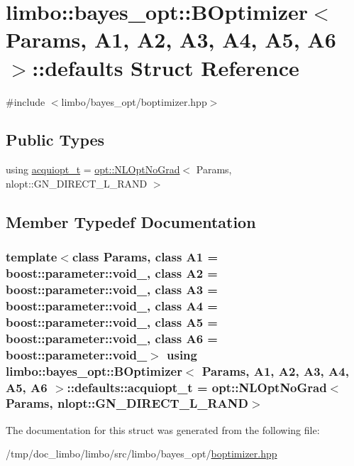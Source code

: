 \hypertarget{structlimbo_1_1bayes__opt_1_1_b_optimizer_1_1defaults}{}\section{limbo\+:\+:bayes\+\_\+opt\+:\+:B\+Optimizer$<$ Params, A1, A2, A3, A4, A5, A6 $>$\+:\+:defaults Struct Reference}
\label{structlimbo_1_1bayes__opt_1_1_b_optimizer_1_1defaults}


{\ttfamily \#include $<$limbo/bayes\+\_\+opt/boptimizer.\+hpp$>$}

\subsection*{Public Types}
\begin{DoxyCompactItemize}
\item 
using \hyperlink{structlimbo_1_1bayes__opt_1_1_b_optimizer_1_1defaults_a354391108ed6c10e11e7c356b3a08c25}{acquiopt\+\_\+t} = \hyperlink{structlimbo_1_1opt_1_1_n_l_opt_no_grad}{opt\+::\+N\+L\+Opt\+No\+Grad}$<$ Params, nlopt\+::\+G\+N\+\_\+\+D\+I\+R\+E\+C\+T\+\_\+\+L\+\_\+\+R\+A\+N\+D $>$
\end{DoxyCompactItemize}


\subsection{Member Typedef Documentation}
\hypertarget{structlimbo_1_1bayes__opt_1_1_b_optimizer_1_1defaults_a354391108ed6c10e11e7c356b3a08c25}{}
\subsubsection[{acquiopt\+\_\+t}]{\setlength{\rightskip}{0pt plus 5cm}template$<$class Params, class A1 = boost\+::parameter\+::void\+\_\+, class A2 = boost\+::parameter\+::void\+\_\+, class A3 = boost\+::parameter\+::void\+\_\+, class A4 = boost\+::parameter\+::void\+\_\+, class A5 = boost\+::parameter\+::void\+\_\+, class A6 = boost\+::parameter\+::void\+\_\+$>$ using {\bf limbo\+::bayes\+\_\+opt\+::\+B\+Optimizer}$<$ Params, A1, A2, A3, A4, A5, A6 $>$\+::{\bf defaults\+::acquiopt\+\_\+t} =  {\bf opt\+::\+N\+L\+Opt\+No\+Grad}$<$Params, nlopt\+::\+G\+N\+\_\+\+D\+I\+R\+E\+C\+T\+\_\+\+L\+\_\+\+R\+A\+N\+D$>$}\label{structlimbo_1_1bayes__opt_1_1_b_optimizer_1_1defaults_a354391108ed6c10e11e7c356b3a08c25}


The documentation for this struct was generated from the following file\+:\begin{DoxyCompactItemize}
\item 
/tmp/doc\+\_\+limbo/limbo/src/limbo/bayes\+\_\+opt/\hyperlink{boptimizer_8hpp}{boptimizer.\+hpp}\end{DoxyCompactItemize}
